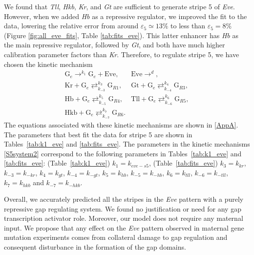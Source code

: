 \documentclass[final,authoryear, 5p, times]{elsarticle}
\begin{document}
We found that \textit{Tll}, \textit{Hkb}, \textit{Kr}, and \textit{Gt} are sufficient to generate stripe 5 of \textit{Eve}. However, when we added \textit{Hb} as a repressive regulator, we improved the fit to the data, lowering the relative error from around $\varepsilon_5\simeq13\%$  to less than $\varepsilon_5=8\%$  (Figure \ref{fig:all_eve_fits}, Table \ref{tab:fits_eve}). This latter enhancer has \textit{Hb} as the main repressive regulator, followed by \textit{Gt}, and both have much higher calibration parameter factors than \textit{Kr}. Therefore, to regulate stripe 5, we have chosen the kinetic mechanism
\begin{equation}  \label{S5system2}
    \begin{array}{ll}
        \displaystyle
        \text{G}_e \mathop{\longrightarrow}^{k_{1}} \text{G}_e + \text{Eve}, & \displaystyle
        \text{Eve} \mathop{\longrightarrow}^{d}, \\ \displaystyle
        \text{Kr} + \text{G}_e \mathop{\rightleftarrows}^{k_{3}}_{k_{-3}} \text{G}_{R1} ,& \displaystyle
        \text{Gt} + \text{G}_e \mathop{\rightleftarrows}^{k_{4}}_{k_{-4}} \text{G}_{R3}, \\ \displaystyle
        \text{Hb} + \text{G}_e \mathop{\rightleftarrows}^{k_{5}}_{k_{-5}} \text{G}_{R4}, & \displaystyle
        \text{Tll} + \text{G}_e \mathop{\rightleftarrows}^{k_{6}}_{k_{-6}} \text{G}_{R5},\\ \displaystyle
        \text{Hkb} + \text{G}_e \mathop{\rightleftarrows}^{k_{7}}_{k_{-7}} \text{G}_{R6} .&
    \end{array}
\end{equation}
The equations associated with these kinetic mechanisms are shown in \ref{AppA}. The parameters that best fit the data for stripe 5 are shown in Tables~\ref{tab:k1_eve} and \ref{tab:fits_eve}. 
The parameters in the kinetic mechanisms \eqref{S5system2} correspond to the following parameters in Tables~\ref{tab:k1_eve} and \ref{tab:fits_eve}: (Table~\ref{tab:k1_eve}) $k_1=k_{eve-s5}$, (Table~\ref{tab:fits_eve}) $k_3=k_{kr}$, $k_{-3}=k_{-kr}$, $k_4=k_{gt}$, $k_{-4}=k_{-gt}$, $k_5=k_{hb}$, $k_{-5}=k_{-hb}$, $k_6=k_{tll}$, $k_{-6}=k_{-tll}$, $k_7=k_{hkb}$ and $k_{-7}=k_{-hkb}$.


Overall, we accurately predicted all the stripes in the \textit{Eve} pattern with a purely repressive gap regulating system. We found no justification or need for any gap transcription activator role. Moreover, our model does not require any maternal input. We propose that any effect on the \textit{Eve} pattern observed in maternal gene mutation experiments comes from collateral damage to gap regulation and consequent disturbance in the formation of the gap domains.
\end{document}
